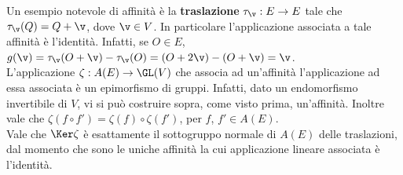 \documentclass[11pt]{article}
\begin{document}
	\begin{remark}\nl
		\li Un esempio notevole di affinità è la \textbf{traslazione} $\tau_{\v} : E \to E$ tale che
		$\tau_{\v}(Q) = Q + \v$, dove $\v \in V$. In particolare l'applicazione associata a tale
		affinità è l'identità. Infatti, se $O \in E$, $g(\v) = \tau_{\v}(O + \v) - \tau_{\v}(O) = (O + 2\v) - (O + \v) = \v$. \\
		\li L'applicazione $\zeta : A(E) \to \GL(V)$ che associa ad un'affinità l'applicazione ad essa
		associata è un epimorfismo di gruppi. Infatti, dato un endomorfismo invertibile di $V$, vi
		si può costruire sopra, come visto prima, un'affinità. Inoltre vale che $\zeta(f \circ f') = \zeta(f) \circ \zeta(f')$, per $f$, $f' \in A(E)$. \\
		\li Vale che $\Ker \zeta$ è esattamente il sottogruppo normale di $A(E)$ delle traslazioni, dal momento
		che sono le uniche affinità la cui applicazione lineare associata è l'identità.
	\end{remark}
\end{document}

